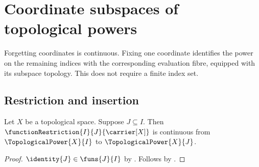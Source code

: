 \section{Coordinate subspaces of topological powers}





Forgetting coordinates is continuous. Fixing one coordinate identifies the
power on the remaining indices with the corresponding evaluation fibre,
equipped with its subspace topology. This does not require a finite index set.

\subsection{Restriction and insertion}

\begin{theorem}\label{topological_power_restriction_continuous}
    Let $X$ be a topological space.
    Suppose $J\subseteq I$.
    Then $\functionRestriction{I}{J}{\carrier[X]}$ is continuous from
        $\TopologicalPower{X}{I}$ to $\TopologicalPower{X}{J}$.
\end{theorem}
\begin{proof}
    $\identity{J}\in\funs{J}{I}$ by .
    Follows by .
\end{proof}

